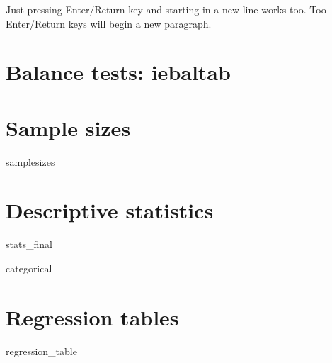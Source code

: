 \documentclass{article}
\begin{document}
Just pressing Enter/Return key and starting in a new line works too. Too Enter/Return keys will begin a new paragraph.


\newpage
\section{Balance tests: iebaltab}
  
\section{Sample sizes}
	\begin{table}[H]
		\centering
		\caption{Sample sizes}
			{samplesizes}
	\end{table}

\section{Descriptive statistics}
	
	\begin{table}[H]
		\centering
		\caption{Descriptive statistics for numeric variables}
			{stats_final}
	\end{table}

	\begin{table}[H]
		\centering
		\caption{Descriptive statistics for categorical variables}
		\begin{adjustbox}{max width=\textwidth}   
			{categorical}
		\end{adjustbox}
	\end{table}
 
\section{Regression tables}

	\begin{table}[H]
		\centering
		\caption{Outcome variable: life expectancy at birth}
		\begin{adjustbox}{max width=\textwidth}   
			{regression_table}
		\end{adjustbox}
	\end{table}
\end{document}
